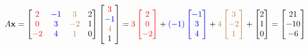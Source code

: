 \documentclass{ximera}
\begin{document}
\begin{example}
$$A\vec{x}=\begin{bmatrix}\color{red}2&\color{blue}-1&\color{brown}3&2\\ \color{red}0&\color{blue}3&\color{brown}-2&1\\ \color{red}-2&\color{blue}4&\color{brown}1&0\end{bmatrix}\begin{bmatrix}\color{red}3\\ \color{blue}-1\\ \color{brown}4\\1\end{bmatrix}=
\color{red}3\begin{bmatrix}\color{red}2\\ \color{red}0\\ \color{red}-2\end{bmatrix}\color{black}+
\color{blue}(-1)\begin{bmatrix}\color{blue}-1\\ \color{blue}3\\ \color{blue}4\end{bmatrix}
\color{black}+\color{brown}4\begin{bmatrix}\color{brown}3\\ \color{brown}-2\\ \color{brown}1\end{bmatrix}
\color{black}+\begin{bmatrix}2\\1\\0\end{bmatrix}
=\begin{bmatrix}21\\-10 \\ -6\end{bmatrix}
$$


\end{example}
\end{document}
